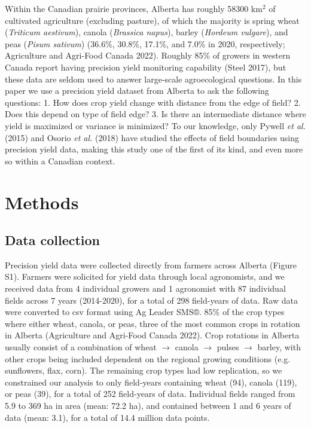 \documentclass[]{elsarticle} %
\begin{document}
Within the Canadian prairie provinces, Alberta has roughly 58300 km$^2$ of cultivated agriculture (excluding pasture), of which the majority is spring wheat (\emph{Triticum aestivum}), canola (\emph{Brassica napus}), barley (\emph{Hordeum vulgare}), and peas (\emph{Pisum sativum}) (36.6\%, 30.8\%, 17.1\%, and 7.0\% in 2020, respectively; Agriculture and Agri-Food Canada 2022).
Roughly 85\% of growers in western Canada report having precision yield monitoring capability (Steel 2017), but these data are seldom used to answer large-scale agroecological questions.
In this paper we use a precision yield dataset from Alberta to ask the following questions:
1. How does crop yield change with distance from the edge of field?
2. Does this depend on type of field edge?
3. Is there an intermediate distance where yield is maximized or variance is minimized?
To our knowledge, only Pywell \emph{et al.} (2015) and Osorio \emph{et al.} (2018) have studied the effects of field boundaries using precision yield data, making this study one of the first of its kind, and even more so within a Canadian context.

\hypertarget{methods}{%
\section{Methods}\label{methods}}

\hypertarget{data-collection}{%
\subsection{Data collection}\label{data-collection}}

Precision yield data were collected directly from farmers across Alberta (Figure S1).
Farmers were solicited for yield data through local agronomists, and we received data from 4 individual growers and 1 agronomist with 87 individual fields across 7 years (2014-2020), for a total of 298 field-years of data. %
Raw data were converted to csv format using Ag Leader SMS®.
85\% of the crop types where either wheat, canola, or peas, three of the most common crops in rotation in Alberta (Agriculture and Agri-Food Canada 2022).
Crop rotations in Alberta usually consist of a combination of wheat \(\rightarrow\) canola \(\rightarrow\) pulses \(\rightarrow\) barley, with other crops being included dependent on the regional growing conditions (e.g. sunflowers, flax, corn).
The remaining crop types had low replication, so we constrained our analysis to only field-years containing wheat (94), canola (119), or peas (39), for a total of 252 field-years of data.
Individual fields ranged from 5.9 to 369 ha in area (mean: 72.2 ha), and contained between 1 and 6 years of data (mean: 3.1), for a total of 14.4 million data points.
\end{document}
